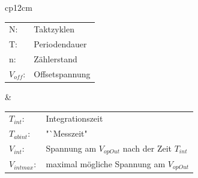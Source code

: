\begin{longtable}{cp{12cm}}
  
  \begin{tabular}{ll}
      N:&Taktzyklen\\
      T:&Periodendauer\\
      n:&Zählerstand\\
      $V_{off}$:&Offsetspannung\\
  \end{tabular}
  &
  
  \begin{tabular}{ll}
      $T_{int}$:&Integrationszeit\\
      $T_{abint}$:& "`Messzeit"\\
      $V_{int}$:&Spannung am $V_{opOut}$ nach der Zeit $T_{int}$\\
      $V_{intmax}:$&maximal mögliche Spannung am $V_{opOut}$\\
  \end{tabular}
\end{longtable}

